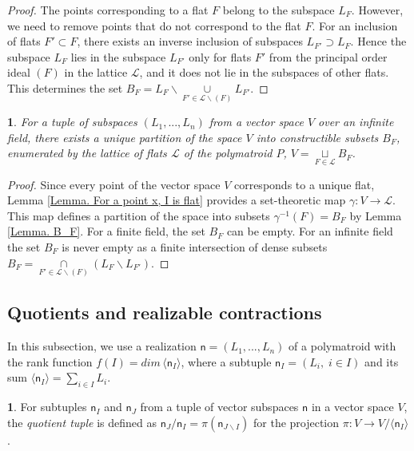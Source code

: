 \documentclass[11pt]{article}
\theoremstyle{plain}
\theoremstyle{definition}
\newtheorem{defn}[thm]{\protect\definitionname}
\theoremstyle{remark}
\theoremstyle{plain}
\theoremstyle{plain}
\newtheorem{prop}[thm]{\protect\propositionname}
\theoremstyle{plain}
\theoremstyle{definition}
\providecommand{\definitionname}{Definition}
\providecommand{\propositionname}{Proposition}
\begin{document}
\begin{proof}
The points corresponding to a flat $F$ belong to the subspace $L_{F}$.
However, we need to remove points that do not correspond to the flat
$F$. For an inclusion of flats $F'\subset F$, there exists an inverse
inclusion of subspaces $L_{F'}\supset L_{F}$. Hence the subspace
$L_{F}$ lies in the subspace $L_{F'}$ only for flats $F'$ from
the principal order ideal $(F)$ in the lattice $\mathcal{L}$, and
it does not lie in the subspaces of other flats. This determines the
set $B_{F}=L_{F}\backslash\underset{F'\in\mathcal{L}\backslash(F)}{\cup}L_{F'}.$
\end{proof}
\begin{prop}
\textup{\label{Proposition. Polymatroid partition of a vector space}}For
a tuple of subspaces $(L_{1},...,L_{n})$ from a vector space $V$
over an infinite field, there exists a unique partition of the space
$V$ into constructible subsets $B_{F}$, enumerated by the lattice
of flats $\mathcal{L}$ of the polymatroid $P$, $V=\underset{F\in\mathcal{L}}{\sqcup}B_{F}$.
\end{prop}

\begin{proof}
Since every point of the vector space $V$ corresponds to a unique
flat, Lemma \ref{Lemma. For a point x, I is flat} provides a set-theoretic
map $\gamma:V\rightarrow\mathcal{L}$. This map defines a partition
of the space into subsets $\gamma^{-1}(F)=B_{F}$ by Lemma \ref{Lemma. B_F}.
For a finite field, the set $B_{F}$ can be empty. For an infinite
field the set $B_{F}$ is never empty as a finite intersection of
dense subsets $B_{F}=\underset{F'\in\mathcal{L}\backslash(F)}{\cap}(L_{F}\backslash L_{F'}).$
\end{proof}

\subsection{Quotients and realizable contractions}

In this subsection, we use a realization $\mathsf{n}=(L_{1},...,L_{n})$
of a polymatroid with the rank function $f(I)=dim\,\langle\mathsf{n}_{I}\rangle$,
where a subtuple $\mathsf{n}_{I}=(L_{i},\;i\in I)$ and its sum $\langle\mathsf{n}_{I}\rangle=\underset{i\in I}{\sum}L_{i}$.
\begin{defn}
For subtuples $\mathsf{n}_{I}$ and $\mathsf{n}_{J}$ from a tuple
of vector subspaces $\mathsf{n}$ in a vector space $V$, the \textit{quotient
tuple} is defined as $\mathsf{n}_{J}/\mathsf{n}_{I}=\pi(\mathsf{n}_{J\backslash I})$
for the projection $\pi:V\rightarrow V/\langle\mathsf{n}_{I}\rangle$.
\end{defn}
\end{document}
